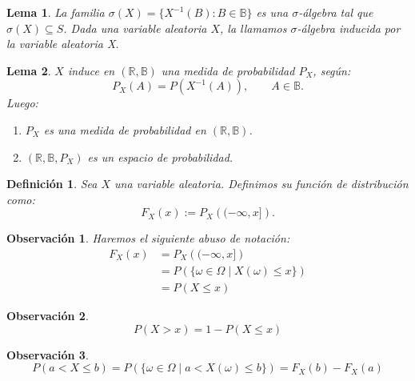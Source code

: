 \documentclass{report}
\newtheorem{lem}{Lema}[section]
\newtheorem{dfn}{Definición}[section]
\newtheorem{obs}{Observación}[section]
\begin{document}
\begin{lem}
    La familia $\sigma(X)=\{X^{-1}(B): B\in\mathbb{B}\}$ es una $\sigma$-álgebra tal que $\sigma(X)\subseteq S$. Dada 
    una variable aleatoria $X$, la llamamos $\sigma$-álgebra \emph{inducida} por la variable aleatoria X.
\end{lem}

\begin{lem} $X$ induce en $(\mathbb{R}, \mathbb{B})$ una medida de probabilidad $P_X$, según:
    $$
    P_X(A) = P(X^{-1}(A)), \qquad A\in\mathbb{B}.
    $$
    Luego:
    \begin{enumerate}
        \item $P_X$ es una medida de probabilidad en $(\mathbb{R}, \mathbb{B})$.
        \item $(\mathbb{R}, \mathbb{B}, P_X)$ es un espacio de probabilidad.
    \end{enumerate}
\end{lem}

\begin{dfn}
Sea $X$ una variable aleatoria. Definimos su \emph{función de distribución} como:
$$
    F_X(x) := P_X\left( (-\infty, x] \right).
$$
\end{dfn}

\begin{obs} Haremos el siguiente abuso de notación:
    \begin{equation*}
        \begin{split}
            F_X(x) &= P_X\left( (-\infty, x] \right)\\
            & = P\left( \{\omega \in \Omega \;|\; X(\omega) \leq x\} \right)\\
            & = P(X\leq x)
        \end{split}
    \end{equation*}
\end{obs}

\begin{obs} 
\begin{equation*}
    P(X>x) = 1 - P(X\leq x)
\end{equation*}
\end{obs}

\begin{obs} 
\begin{equation*}
    P(a<X\leq b) =  P\left( \{\omega \in \Omega \;|\; a< X(\omega) \leq b\} \right) = F_X(b)-F_X(a)
\end{equation*}
\end{obs}
\end{document}
